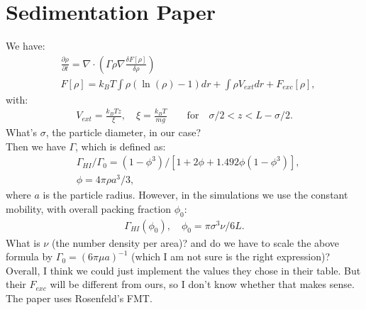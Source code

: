 \documentclass[11pt, a4paper]{article}
\theoremstyle{definition}
\begin{document}
\section{Sedimentation Paper}
	We have:
	\begin{align*}
	&\frac{\partial \rho}{\partial t} = \nabla \cdot \left( \Gamma \rho \nabla \frac{\delta F[\rho]}{\delta \rho} \right) \\
	&F[\rho] = k_BT \int \rho (\ln(\rho)  - 1)dr + \int \rho V_{ext} dr + F_{exc} [\rho],  
	\end{align*}
	with:
	\begin{align*}
	V_{ext} = \frac{k_BT z}{\xi}, \quad \xi = \frac{k_BT}{mg} \qquad \text{for} \quad \sigma/2 < z < L - \sigma /2.
	\end{align*}
	What's $\sigma$, the particle diameter, in our case?\\
	Then we have $\Gamma$, which is defined as:
	\begin{align*}
	&\Gamma_{HI} / \Gamma_0 = (1 - \phi^3)/ [ 1+ 2 \phi + 1.492 \phi(1-\phi^3)],\\
	& \phi = 4 \pi \rho a^3/3,
	\end{align*}
	where $a$ is the particle radius. 
	However, in the simulations we use the constant mobility, with overall packing fraction $\phi_0$:
	\begin{align*}
	\Gamma_{HI}(\phi_0), \quad \phi_0 = \pi \sigma^3 \nu / 6L.
	\end{align*}
	What is $\nu$ (the number density per area)? and do we have to scale the above formula by $\Gamma_0 = (6 \pi \mu a)^{-1}$ (which I am not sure is the right expression)?
	Overall, I think we could just implement the values they chose in their table. But their $F_{exc}$ will be different from ours, so I don't know whether that makes sense.
	The paper uses Rosenfeld's FMT.
	
	
\end{document}
